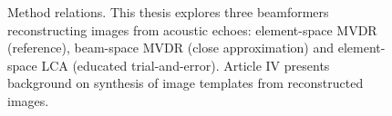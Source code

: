 {%
% 
% 
% 
% 

\begin{figure}[tp]
\caption{Method relations. This thesis explores three beamformers reconstructing images from acoustic echoes: element-space MVDR (reference), beam-space MVDR (close approximation) and element-space LCA (educated trial-and-error). Article IV presents background on synthesis of image templates from reconstructed images. }\label{2_fig_article_relation}
\end{figure}


}
